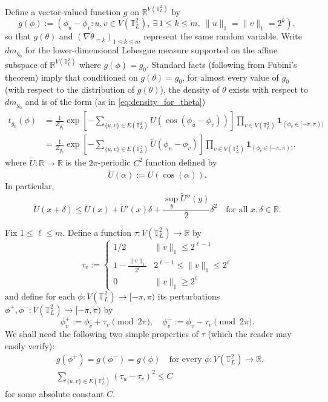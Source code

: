 \documentclass[12pt,reqno]{article}
\def\R{\mathbb{R}}
\def\T{\mathbb{T}}
\def\one{\mathbf{1}}
\begin{document}
Define a vector-valued function $g$ on $\R^{V(\T_L^2)}$ by
\begin{equation*}
  g(\phi) := \left(\phi_u - \phi_v\colon u,v\in V(\T_L^2), ~\exists\, 1\le k\le m,~ \|u\|_1 =
  \|v\|_1=2^k \right),
\end{equation*}
so that $g(\theta)$ and $(\nabla\theta_{=k})_{1 \le k \le m}$ represent the same random variable.
Write $dm_{g_0}$ for the lower-dimensional Lebesgue measure supported on
the affine subspace of $\R^{V(\T_L^2)}$ where $g(\phi) = g_0$.
Standard facts (following from Fubini's theorem) imply that
conditioned on $g(\theta) = g_0$, for almost every value of $g_0$ (with respect to the distribution of
$g(\theta)$),
the density of $\theta$ exists with respect to $dm_{g_0}$ and is of
the form (as in \eqref{eq:density_for_theta})
\begin{align*}
  t_{g_0}(\phi) &= \frac{1}{Z_{g_0}}\exp \left[-\sum_{\{u,v\}\in
E(\T_L^2)}U(\cos(\phi_u - \phi_v))\right]
  \prod_{v\in V(\T_L^2)} \one_{(\phi_v\in [-\pi,\pi))}\\
  &= \frac{1}{Z_{g_0}}\exp \left[-\sum_{\{u,v\}\in
E(\T_L^2)}\tilde{U}(\phi_u - \phi_v)\right]
  \prod_{v\in V(\T_L^2)} \one_{(\phi_v\in [-\pi,\pi))},
\end{align*}
where $\tilde{U}:\R\to\R$ is the $2\pi$-periodic $C^2$
function defined by
\begin{equation}\label{eq:U_tilde_def}
  \tilde{U}(\alpha) := U(\cos(\alpha)) .
\end{equation}
In particular,
\begin{equation}\label{eq:tilde_U_Taylor_expansion}
  \tilde{U}(x + \delta) \le \tilde{U}(x) + \tilde{U}'(x)\delta + \frac{\sup_y \tilde{U}''(y)}{2}
  \delta^2\quad\text{for all $x,\delta\in\R$}.
\end{equation}

Fix $1\le \ell \le m$. Define a function $\tau:V(\T_L^2)\to \R$ by
\begin{equation}\label{eq:tau_def}
  \tau_v:=\begin{cases}
    1/2 & \|v\|_1\le 2^{\ell-1}\\
    1 - \frac{\|v\|_1}{2^\ell} & 2^{\ell-1} \le\|v\|_1 \le 2^\ell\\
    0 & \|v\|_1\ge 2^\ell
  \end{cases}
\end{equation}
and define for each $\phi:V(\T_L^2)\to[-\pi,\pi)$ its perturbations
$\phi^+, \phi^-:V(\T_L^2)\to[-\pi,\pi)$ by
\begin{equation}\label{eq:t_plus_minus_def}
  \phi^+_v := \phi_v + \tau_v \pmod{2\pi},\quad \phi^-_v := \phi_v -
  \tau_v \pmod{2\pi}.
\end{equation}
We shall need the following two simple properties of $\tau$ (which the reader may easily verify):
\begin{align}
  &g(\phi^+) = g(\phi^-) =
  g(\phi)\quad \text{for every $\phi:V(\T_L^2)\to\R$}, \label{eq:g_0_preserved}\\
  &\sum_{\{u,v\}\in E(\T_L^2)} (\tau_u - \tau_v)^2 \le C
  \label{eq:finite_energy_tau}
\end{align}
for some absolute constant $C$.
\end{document}
